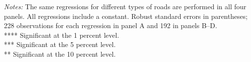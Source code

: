 \begin{table}[htbp]
\begin{tabular}{l*{3}{c}}
\hline\hline
\end{tabular}
\begin{flushleft}
\emph{Notes:} The same regressions for different types of roads are performed in all four panels. All regressions include a constant. Robust standard errors in parentheses; 228 observations for each regression in panel A and 192 in panels B–D. \\         **** Significant at the 1 percent level. \\         *** Significant at the 5 percent level. \\         ** Significant at the 10 percent level.
\end{flushleft}
\end{table}
